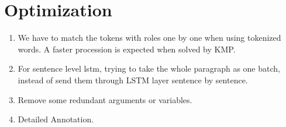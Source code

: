 \documentclass[12pt]{article}
\begin{document}
    \section{Optimization}
    \begin{enumerate}
        \item We have to match the tokens with roles one by one when using tokenized words.
        A faster procession is expected when solved by KMP. 
        \item For sentence level lstm, trying to take the whole paragraph as one batch,
        instead of send them through LSTM layer sentence by sentence.
        \item Remove some redundant arguments or variables.
        \item Detailed Annotation.
    \end{enumerate}
\end{document}
